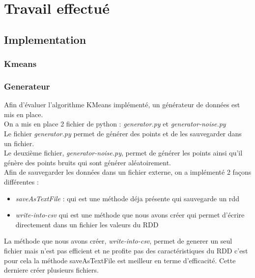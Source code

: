 \documentclass[french]{article}
\begin{document}
\section{Travail effectué}
\subsection{Implementation}
\subsubsection{Kmeans}
\subsubsection{Generateur}
Afin d’évaluer l’algorithme KMeans implémenté, un générateur de données est mis en place. \\

On a mis en place 2 fichier de python : \textit{generator.py} et \textit{generator-noise.py} \\
Le fichier \textit{generator.py} permet de générer des points et de les sauvegarder dans un fichier. \\
Le deuxième fichier, \textit{generator-noise.py}, permet de générer les points ainsi qu’il génère des points bruits qui sont générer aléatoirement.\\

Afin de sauvegarder les données dans un fichier externe, on a implémenté 2 façons différentes : 
\begin{itemize}
\item 	\textit{saveAsTextFile} : qui est une méthode déja présente qui sauvegarde un rdd
\item 	\textit{write-into-csv} qui est une méthode que nous avons créer qui permet d'écrire directement dans un fichier les valeurs du RDD
\end{itemize}
La méthode que nous avons créer, \textit{write-into-csv},  permet de generer un seul fichier mais n'est pas efficient et ne profite pas des caractéristiques du RDD c'est pour cela la méthode saveAsTextFile est meilleur en terme d'efficacité. Cette derniere créer plusieurs fichiers.
\end{document}
